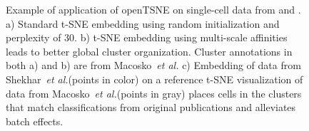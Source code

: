 \documentclass{bioinfo}
\def\etal{{\em et al.}\xspace}
\begin{document}
\begin{figure}[htbp]
\caption{Example of application of openTSNE on single-cell data from
\citet{Macosko2015} and \citet{Shekhar2016}. a) Standard t-SNE embedding using
random initialization and perplexity of 30. b) t-SNE embedding using
multi-scale affinities leads to better global cluster organization. Cluster
annotations in both a) and b) are from Macosko~\etal c) Embedding of data from
Shekhar~\etal (points in color) on a reference t-SNE visualization of data from
Macosko~\etal (points in gray) places cells in the clusters that match
classifications from original publications and alleviates batch effects.}
\label{fig:tsne}
\end{figure}
\end{document}
